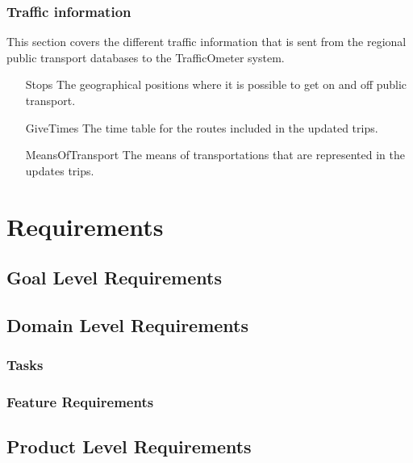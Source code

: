 \documentclass[a4paper]{article}
\begin{document}
			\subsubsection{Traffic information} %
			\label{ssub:traffic_information}
			This section covers the different traffic information that is sent from the regional public transport databases to the TrafficOmeter system.
			\begin{itemize}
				\item[Stops] The geographical positions where it is possible to get on and off public transport.
				\item[GiveTimes] The time table for the routes included in the updated trips.
				\item[MeansOfTransport] The means of transportations that are represented in the updates trips.
			\end{itemize}
		
	
	
	\section{Requirements}
		\subsection{Goal Level Requirements}
			
		\subsection{Domain Level Requirements}
			\subsubsection{Tasks}
				
			\subsubsection{Feature Requirements}
								
			
		\subsection{Product Level Requirements}		
\end{document}
